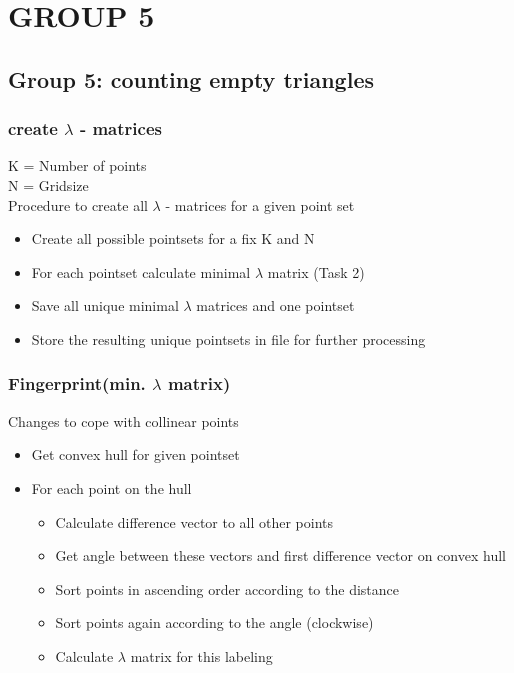
\section{GROUP 5}
\subsection{Group 5: counting empty triangles}
\begin{frame}
\frametitle{create $\lambda$ - matrices}
K = Number of points \\
N = Gridsize \\
Procedure to create all $\lambda$ - matrices for a given point set \\
\begin{itemize}
  \item Create all possible pointsets for a fix K and N
  \item For each pointset calculate minimal $\lambda$ matrix (Task 2)
  \item Save all unique minimal $\lambda$ matrices and one pointset
  \item Store the resulting unique pointsets in file for further processing
\end{itemize}
\end{frame}

\begin{frame}
\frametitle{Fingerprint(min. $\lambda$ matrix)}
Changes to cope with collinear points
\begin{itemize}
  \item Get convex hull for given pointset
  \item For each point on the hull
  \begin{itemize}
    \item Calculate difference vector to all other points
    \item Get angle between these vectors and first difference vector on convex hull
    \item Sort points in ascending order according to the distance
    \item Sort points again according to the angle (clockwise)
    \item Calculate $\lambda$ matrix for this labeling
  \end{itemize}
\end{itemize}
\end{frame}

